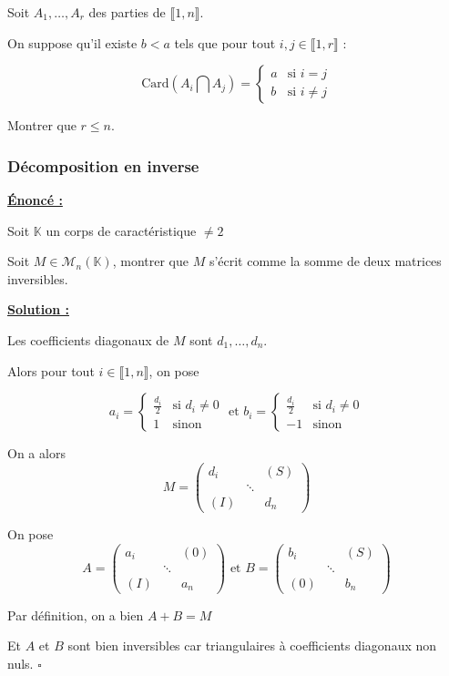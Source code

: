Soit $A_1,\dots, A_r$ des parties de $\llbracket 1,n\rrbracket$.

On suppose qu'il existe $b<a$ tels que pour tout $i,j \in \llbracket 1,r\rrbracket$ : 

$$ 
\text{Card}(A_i \bigcap A_j) = 
\begin{cases} a & \mbox{si }  i=j \\ b & \mbox{si } i \neq j \end{cases}
$$

Montrer que $r \leq n$.

\subsubsection{Décomposition en inverse}
\textbf{\underline{Énoncé :}} 

Soit $\mathbb{K}$ un corps de caractéristique $\neq 2$

Soit $M \in \mathcal{M}_n(\mathbb{K})$, 
montrer que $M$ s'écrit comme la somme de deux matrices inversibles.

\textbf{\underline{Solution :}}

Les coefficients diagonaux de $M$ sont $d_1,\dots,d_n$.

Alors pour tout $i \in \llbracket 1,n\rrbracket$, on pose 

$$
a_i = \begin{cases} \frac{d_i}{2} & \mbox{si }  d_i\neq 0 \\ 1 & \mbox{sinon } \end{cases} \text{ et } b_i = \begin{cases} \frac{d_i}{2} & \mbox{si }  d_i\neq 0 \\ -1 & \mbox{sinon }  \end{cases}
$$

On a alors 
$$
M =
\begin{pmatrix}
d_i &  &(S)\\
    &\ddots & \\
 (I)   &  & d_n 
\end{pmatrix}
$$

On pose 
$$
A = \begin{pmatrix}
a_i &  &(0)\\
    &\ddots & \\
 (I)   &  & a_n 
\end{pmatrix} 
\text{ et } 
B = 
\begin{pmatrix}
b_i &  &(S)\\
    &\ddots & \\
 (0)   &  & b_n 
\end{pmatrix}
$$

Par définition, on a bien $A + B = M$

Et $A$ et $B$ sont bien inversibles car triangulaires à coefficients diagonaux non nuls. $\square $

